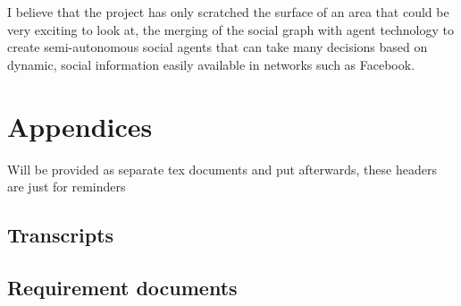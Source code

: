 \documentclass[a4paper,11pt]{report}
\begin{document}
I believe that the project has only scratched the surface of an area that could
be very exciting to look at, the merging of the social graph with agent
technology to create semi-autonomous social agents that can take many decisions
based on dynamic, social information easily available in networks such as
Facebook.

{}



\chapter{Appendices}

Will be provided as separate tex documents and put afterwards, these headers are
just for reminders

\section{Transcripts}

\section{Requirement documents}
\end{document}
